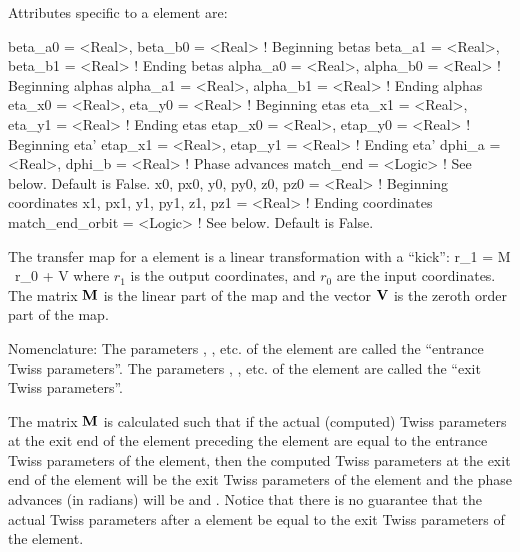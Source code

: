 {Attributes specific to a  element are:
\begin{example}
  beta_a0   = <Real>,  beta_b0  = <Real>   ! Beginning betas
  beta_a1   = <Real>,  beta_b1  = <Real>   ! Ending betas
  alpha_a0  = <Real>,  alpha_b0 = <Real>   ! Beginning alphas
  alpha_a1  = <Real>,  alpha_b1 = <Real>   ! Ending alphas
  eta_x0    = <Real>,  eta_y0   = <Real>   ! Beginning etas 
  eta_x1    = <Real>,  eta_y1   = <Real>   ! Ending etas 
  etap_x0   = <Real>,  etap_y0  = <Real>   ! Beginning eta' 
  etap_x1   = <Real>,  etap_y1  = <Real>   ! Ending eta'
  dphi_a    = <Real>,  dphi_b   = <Real>   ! Phase advances
  match_end = <Logic>                      ! See below. Default is False.
  x0, px0, y0, py0, z0, pz0 = <Real>       ! Beginning coordinates
  x1, px1, y1, py1, z1, pz1 = <Real>       ! Ending coordinates
  match_end_orbit = <Logic>                ! See below. Default is False.
\end{example}

The transfer map for a  element is a linear transformation 
with a ``kick'':
\Begineq
  r_1 = \Bf M \, r_0 + \Bf V 
\Endeq
where $r_1$ is the output coordinates, and $r_0$ are the input
coordinates. The matrix ${\bf M}$ is the linear part of the map and the
vector ${\bf V}$ is the zeroth order part of the map.

Nomenclature: The parameters , , etc. of the
 element are called the ``entrance Twiss parameters''. The
parameters , , etc. of the  element
are called the ``exit Twiss parameters''.

The matrix ${\bf M}$ is calculated such that if the actual (computed)
Twiss parameters at the exit end of the element preceding the
 element are equal to the entrance Twiss parameters of the
 element, then the computed Twiss parameters at the exit
end of the  element will be the exit Twiss parameters of the
 element and the phase advances (in radians) will be
 and . Notice that there is no guarantee that
the actual Twiss parameters after a  element be equal to 
the exit Twiss parameters of the  element.

}
